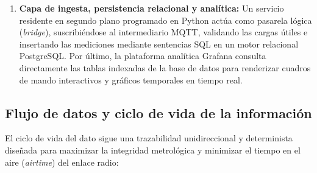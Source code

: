 \begin{enumerate}
    \item \textbf{Capa de ingesta, persistencia relacional y analítica:} Un servicio residente en segundo plano programado en Python actúa como pasarela lógica (\textit{bridge}), suscribiéndose al intermediario MQTT, validando las cargas útiles e insertando las mediciones mediante sentencias SQL en un motor relacional PostgreSQL. Por último, la plataforma analítica Grafana consulta directamente las tablas indexadas de la base de datos para renderizar cuadros de mando interactivos y gráficos temporales en tiempo real.
\end{enumerate}

\subsection{Flujo de datos y ciclo de vida de la información}

El ciclo de vida del dato sigue una trazabilidad unidireccional y determinista diseñada para maximizar la integridad metrológica y minimizar el tiempo en el aire (\textit{airtime}) del enlace radio:


